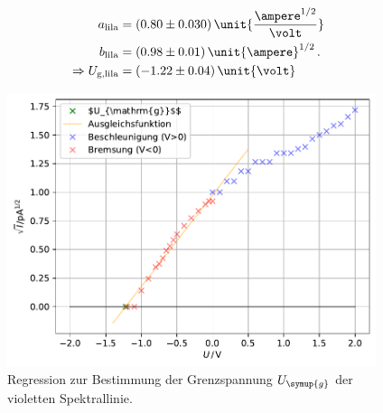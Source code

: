 \begin{align*}
    a_{\text{lila}}&=(0.80\pm 0.030) \, \unit{\frac{\ampere ^{1/2}}{\volt}}\\
    b_{\text{lila}}&=(0.98\pm 0.01) \, \unit{\ampere}^{1/2}\, .\\
    \Rightarrow U_{\text{g,lila}}&=(-1.22\pm 0.04)\, \unit{\volt}\\
\end{align*}

\begin{figure}
    \centering
    \includegraphics[height = 8cm]{build/plotlila.pdf}
    \caption{Regression zur Bestimmung der Grenzspannung $U_{\symup{g}}$ der violetten Spektrallinie.}
    \label{fig:lila}
\end{figure}


